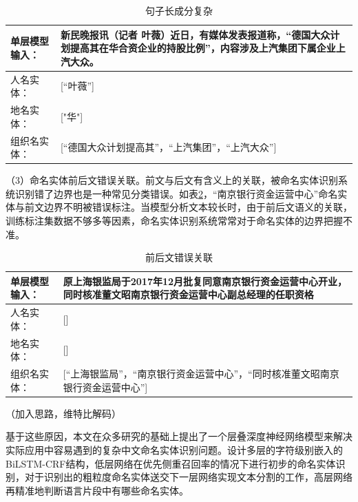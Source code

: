 \documentclass[winfonts,master,oneside,nobackinfo]{njuthesis}
\begin{document}
\begin{table}[h]
\centering
\begin{tabularx}{0.95\textwidth}{|l|X|}
\hline
单层模型输入： & 新民晚报讯（记者 叶薇）近日，有媒体发表报道称，“德国大众计划提高其在华合资企业的持股比例”，内容涉及上汽集团下属企业上汽大众。 \\ \hline
人名实体：         & {[}“叶薇”{]}                                                       \\ \hline
地名实体：         & {[}"华"{]}                                                        \\ \hline
组织名实体：        & {[}“德国大众计划提高其”，“上汽集团”，“上汽大众”{]}  \\ \hline
\end{tabularx}
\caption{句子长成分复杂}
\label{long}
\end{table}


（3）命名实体前后文错误关联。前文与后文有含义上的关联，被命名实体识别系统识别错了边界也是一种常见分类错误。如表\ref{mix}，“南京银行资金运营中心”命名实体与前文边界不明被错误标注。当模型分析文本较长时，由于前后文语义的关联，训练标注集数据不够多等因素，命名实体识别系统常常对于命名实体的边界把握不准。


\begin{table}[h]
\centering
\begin{tabularx}{0.95\textwidth}{|l|X|}
\hline
单层模型输入： & 原上海银监局于2017年12月批复同意南京银行资金运营中心开业，同时核准董文昭南京银行资金运营中心副总经理的任职资格 \\ \hline
人名实体：             & {[}{]}                                                           \\ \hline
地名实体：             & {[}{]}                                                           \\ \hline
组织名实体：            & {[}“上海银监局”，“南京银行资金运营中心”，“同时核准董文昭南京银行资金运营中心”{]}                   \\ \hline
\end{tabularx}
\caption{前后文错误关联}
\label{mix}
\end{table}

（加入思路，维特比解码）

基于这些原因，本文在众多研究的基础上提出了一个层叠深度神经网络模型来解决实际应用中容易遇到的复杂中文命名实体识别问题。设计多层的字符级别嵌入的BiLSTM-CRF结构，低层网络在优先侧重召回率的情况下进行初步的命名实体识别，对于识别出的粗粒度命名实体送交下一层网络实现文本分割的工作，高层网络再精准地判断语言片段中有哪些命名实体。
\end{document}
